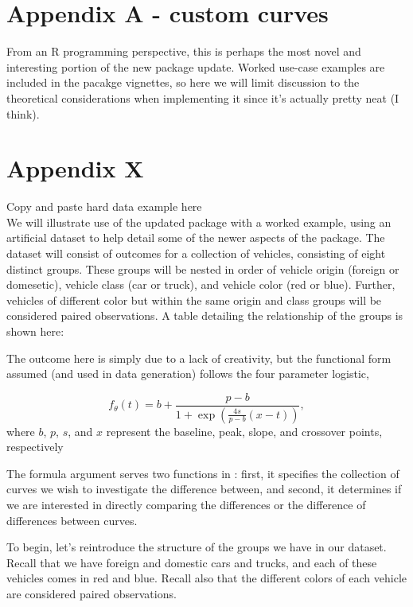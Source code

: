 \appendix

\section*{Appendix A - custom curves}

From an R programming perspective, this is perhaps the most novel and interesting portion of the new package update. Worked use-case examples are included in the pacakge vignettes, so here we will limit discussion to the theoretical considerations when implementing it since it's actually pretty neat (I think). 



\section*{Appendix X} Copy and paste hard data example here \\

We will illustrate use of the updated  package with a worked example, using an artificial dataset to help detail some of the newer aspects of the package. The dataset will consist of outcomes for a collection of vehicles, consisting of eight distinct groups. These groups will be nested in order of vehicle origin (foreign or domesetic), vehicle class (car or truck), and vehicle color (red or blue). Further, vehicles of different color but within the same origin and class groups will be considered paired observations. A table detailing the relationship of the groups is shown here:



The outcome here is simply  due to a lack of creativity, but the functional form assumed (and used in data generation) follows the four parameter logistic, 

\begin{equation}
f_{\theta}(t) = b + \frac{p-b}{1 + \exp \left( \frac{4s}{p-b} (x-t) \right)},
\end{equation}
where $b$, $p$, $s$, and $x$ represent the baseline, peak, slope, and crossover points, respectively



The formula argument serves two functions in : first, it specifies the collection of curves we wish to investigate the difference between, and second, it determines if we are interested in directly comparing the differences or the difference of differences between curves. 

To begin, let's reintroduce the structure of the groups we have in our dataset. Recall that we have foreign and domestic cars and trucks, and each of these vehicles comes in red and blue. Recall also that the different colors of each vehicle are considered paired observations.

